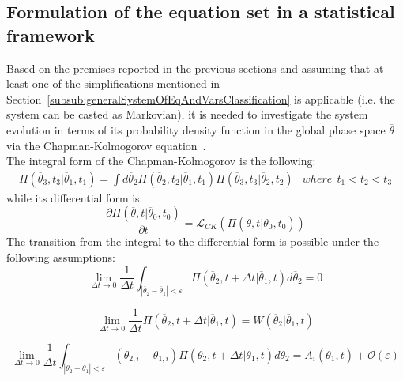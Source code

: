 \subsection{Formulation of the equation set in a statistical framework}
Based on the premises reported in the previous sections and assuming
that at least one of the simplifications mentioned in
Section~\ref{subsub:generalSystemOfEqAndVarsClassification} is applicable (i.e. the system can be
casted as Markovian), it is needed to investigate the system evolution
in terms of its probability density function in the global phase space
$\overline{\theta}$ via the Chapman-Kolmogorov
equation~\cite{ProbReactoDynamicsDevooght}.
\\The integral form of the Chapman-Kolmogorov is the following:
\begin{equation}
\label{eq:chapKolmogIntegralForm}
\begin{matrix}
\Pi \left (\overline{\theta}_{3},t_{3}|\overline{\theta}_{1},t_{1}  \right ) = \int
d\overline{\theta}_{2} \Pi\left (\overline{\theta}_{2},t_{2}|
\overline{\theta}_{1},t_{1}  \right )   \Pi\left (\overline{\theta}_{3},t_{3}|
\overline{\theta}_{2},t_{2}  \right )   &
where \: \:   t_{1} < t_{2} < t_{3}
\end{matrix}
\end{equation}
while its differential form is:
\begin{equation}
\label{eq:chapKolmogDiffForm}
\frac{\partial \Pi \left (\overline{\theta},t|\overline{\theta}_{0},t_{0}  \right )  }{\partial t} =
\mathcal{L}_{CK}\left (   \Pi \left (\overline{\theta},t|\overline{\theta}_{0},t_{0}  \right ) \right )
\end{equation}
The transition from the integral to the differential form is possible under the following assumptions:
\begin{equation}
\label{eq:chapKolmogAssump1}
\lim_{\Delta t \to 0} \frac{1}{\Delta t}  \int_{|
\overline{\theta}_{2}-\overline{\theta}_{1}|<\varepsilon }   \Pi \left
(\overline{\theta}_{2},t+\Delta t|\overline{\theta}_{1},t  \right )
d\overline{\theta}_{2} = 0
\end{equation}

\begin{equation}
\label{eq:chapKolmogAssump2}
\lim_{\Delta t \to 0} \frac{1}{\Delta t} \Pi \left (\overline{\theta}_{2},t+\Delta t|
\overline{\theta}_{1},t  \right ) = W\left ( \overline{\theta}_{2}|
\overline{\theta}_{1},t \right )
\end{equation}

\begin{equation}
\label{eq:chapKolmogAssump3}
\lim_{\Delta t \to 0} \frac{1}{\Delta t}  \int_{|
\overline{\theta}_{2}-\overline{\theta}_{1}|<\varepsilon }
\left ( \overline{\theta}_{2,i} - \overline{\theta}_{1,i} \right )
\Pi \left (\overline{\theta}_{2},t+\Delta t|\overline{\theta}_{1},t  \right )
d\overline{\theta}_{2} = A_{i}\left ( \overline{\theta}_{1},t \right ) +
\mathcal{O}\left ( \varepsilon \right )
\end{equation}

